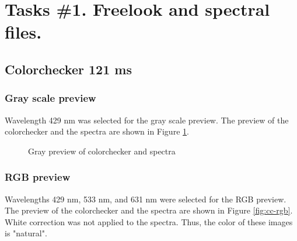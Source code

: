 \section{Tasks \#1. Freelook and spectral files.}

\subsection{Colorchecker 121 ms}

\subsubsection{Gray scale preview}
Wavelength 429 nm was selected for the gray scale preview. The preview of the colorchecker and the spectra are shown in Figure \ref{fig:cc-gray}.

\begin{figure}[H] %
  \centering
  \hspace{0.1cm}
  \caption[]{Gray preview of colorchecker and spectra }
  \label{fig:cc-gray}
\end{figure}

\subsubsection{RGB preview}
Wavelengths 429 nm, 533 nm, and 631 nm were selected for the RGB preview. The preview of the colorchecker and the spectra are shown in Figure \ref{fig:cc-rgb}. White correction was not applied to the spectra. Thus, the color of these images is "natural".


